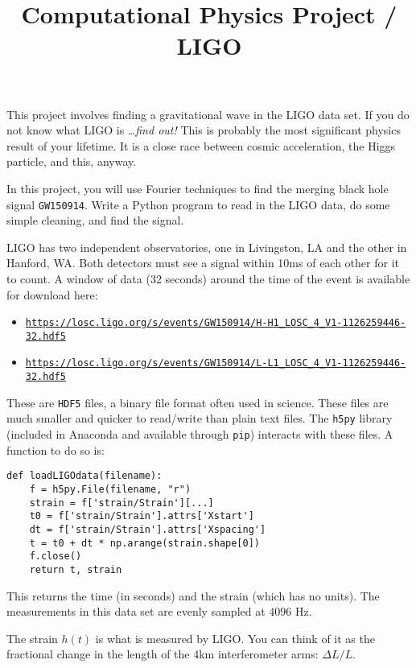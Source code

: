 \documentclass[11pt, preprint]{aastex}
\begin{document}
\title{\bf Computational Physics Project / LIGO}

This project involves finding a gravitational wave in the LIGO data
set. If you do not know what LIGO is \ldots {\it find out!} This is
probably the most significant physics result of your lifetime. It is
a close race between cosmic acceleration, the Higgs particle, and
this, anyway.

In this project, you will use Fourier techniques to find the merging
black hole signal \texttt{GW150914}.  Write a Python program to read
in the LIGO data, do some simple cleaning, and find the signal.

LIGO has two independent observatories, one in Livingston, LA and the
other in Hanford, WA. Both detectors must see a signal within 10ms of
each other for it to count. A window of data (32 seconds) around the
time of the event is available for download here:
			
\begin{itemize}
\item
  \href{https://losc.ligo.org/s/events/GW150914/H-H1_LOSC_4_V1-1126259446-32.hdf5}{\texttt{https://losc.ligo.org/s/events/GW150914/H-H1\_LOSC\_4\_V1-1126259446-32.hdf5}}
\item
  \href{https://losc.ligo.org/s/events/GW150914/L-L1_LOSC_4_V1-1126259446-32.hdf5}{\texttt{https://losc.ligo.org/s/events/GW150914/L-L1\_LOSC\_4\_V1-1126259446-32.hdf5}}
\end{itemize}

These are \texttt{HDF5} files, a binary file format often used in
science. These files are much smaller and quicker to read/write than
plain text files.  The \texttt{h5py} library (included in Anaconda
and available through \texttt{pip}) interacts with these files.  A
function to do so is:
\begin{verbatim}
def loadLIGOdata(filename):
    f = h5py.File(filename, "r")
    strain = f['strain/Strain'][...]
    t0 = f['strain/Strain'].attrs['Xstart']
    dt = f['strain/Strain'].attrs['Xspacing']
    t = t0 + dt * np.arange(strain.shape[0])
    f.close()
    return t, strain
\end{verbatim}
This returns the time (in seconds) and the strain (which has no
units).  The measurements in this data set are evenly sampled at
$4096$ Hz.

The strain $h(t)$ is what is measured by LIGO. You can think of it as
the fractional change in the length of the 4km interferometer arms:
$\Delta L / L$.
\end{document}
